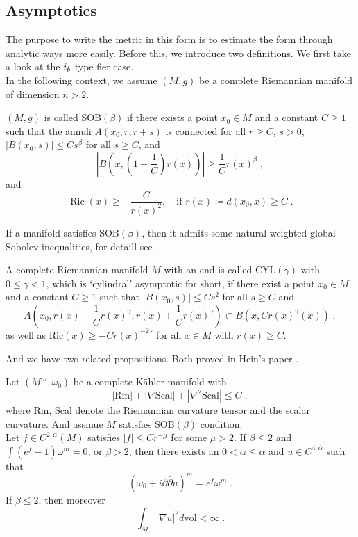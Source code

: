 \subsection{Asymptotics}
The purpose to write the metric in this form is to estimate the form through analytic ways more easily. Before this, we introduce two definitions. We first take a look at the $\uppercase\expandafter{\romannumeral1}_b$ type fier case. \\ \indent
In the following context, we assume $(M,g)$ be a complete Riemannian manifold of dimension $n>2$.
\begin{definition}
$(M,g)$ is called SOB$(\beta)$ if there exists a point $x_0\in M$ and a constant $C\geq 1$ such that the annuli $A(x_0,r,r+s)$ is connected for all $r\geq C$, $s>0$, $|B(x_0,s)|\leq Cs^\beta$ for all $s\geq C$, and \[ \left|B\left(x,\left(1-\frac{1}{C}\right)r(x)\right)\right|\geq\frac{1}{C}r(x)^\beta\; , \]
and
\[ \operatorname{Ric}(x)\geq -\frac{C}{r(x)^2},\quad \textrm{if }r(x)\coloneq d(x_0,x)\geq C\; . \]
\end{definition}
\indent If a manifold satisfies SOB$(\beta)$, then it admits some natural weighted global Sobolev inequalities, for detaill see \cite{hein2011weighted}.
\begin{definition}
A complete Riemannian manifold $M$ with an end is called CYL$(\gamma)$ with $0\leq\gamma<1$, which is `cylindral' asymptotic for short, if there exist a point $x_0\in M$ and a constant $C\geq 1$ such that $|B(x_0,s)|\leq Cs^2$ for all $s\geq C$ and 
\[ A\left(x_0,r(x)-\frac{1}{C}r(x)^\gamma,r(x)+\frac{1}{C}r(x)^\gamma\right)\subset B\left(x,Cr(x)^\gamma(x)\right)\; ,  \]
as well as Ric$(x)\geq -Cr(x)^{-2\gamma}$ for all $x\in M$ with $r(x)\geq C$.
\end{definition}
And we have two related propositions. Both proved in Hein's paper \cite{hein2012gravitational} \cite{hein2011weighted}.\\ \indent
\begin{proposition}
Let $(M^m,\omega_0)$ be a complete K{\"a}hler manifold with
\[ |\mathrm{Rm}|+|\nabla \mathrm{Scal}|+|\nabla^2 \mathrm{Scal} |\leq C \; , \]
where Rm, Scal denote the Riemannian curvature tensor and the scalar curvature. And assmue $M$ satisfies SOB$(\beta)$ condition.\\ \indent
Let $f\in C^{2,\alpha}(M)$ satisfies $|f|\leq Cr^{-\mu}$ for some $\mu>2$. If $\beta\leq 2$ and $\int(e^f-1)\omega^m=0$, or $\beta>2$, then there exists an $0<\bar{\alpha}\leq \alpha$ and $u\in C^{4,\bar{\alpha}}$ such that
\[ \left(\omega_0+i\partial\bar{\partial}u  \right)^m=e^f\omega^m\; . \]
If $\beta\leq 2$, then moreover 
\[ \int_M|\nabla u|^2 d\mathrm{vol}<\infty\; . \]
\end{proposition}
